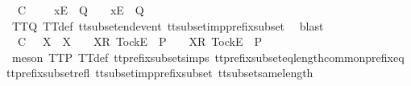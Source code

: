 \begin{isabellebody}
\ {\isachardoublequoteopen}{\isasymrho}{\isacharprime}\ {\isasymsubseteq}\isactrlsub C\ {\isasymrho}{\isacharprime}{\isacharprime}\ {\isasymLongrightarrow}\ {\isasymrho}{\isacharprime}{\isacharprime}\ {\isacharat}\ {\isacharbrackleft}{\isacharbrackleft}x{\isacharbrackright}\isactrlsub E{\isacharbrackright}\ {\isasymin}\ Q\ {\isasymLongrightarrow}\ {\isasymrho}{\isacharprime}\ {\isacharat}\ {\isacharbrackleft}{\isacharbrackleft}x{\isacharbrackright}\isactrlsub E{\isacharbrackright}\ {\isasymin}\ Q{\isachardoublequoteclose}\isanewline
\ \ \ \ \ \ \isamarkupfalse%
\ TT{}{\isacharunderscore}Q\ TT{}{\isacharunderscore}def\ tt{\isacharunderscore}subset{\isacharunderscore}end{\isacharunderscore}event\ tt{\isacharunderscore}subset{\isacharunderscore}imp{\isacharunderscore}prefix{\isacharunderscore}subset\ \isamarkupfalse%
\ blast\isanewline
\ \ \isamarkupfalse%
\isanewline
\ \ \ \ \isamarkupfalse%
\ {\isachardoublequoteopen}{\isasymrho}{\isacharprime}\ {\isasymsubseteq}\isactrlsub C\ {\isasymrho}{\isacharprime}{\isacharprime}\ {\isasymLongrightarrow}\ X\ {\isasymsubseteq}\ X{\isacharprime}\ {\isasymLongrightarrow}\ {\isasymrho}{\isacharprime}{\isacharprime}\ {\isacharat}\ {\isacharbrackleft}{\isacharbrackleft}X{\isacharprime}{\isacharbrackright}\isactrlsub R{\isacharcomma}\ {\isacharbrackleft}Tock{\isacharbrackright}\isactrlsub E{\isacharbrackright}\ {\isasymin}\ P\ {\isasymLongrightarrow}\ {\isasymrho}{\isacharprime}\ {\isacharat}\ {\isacharbrackleft}{\isacharbrackleft}X{\isacharbrackright}\isactrlsub R{\isacharcomma}\ {\isacharbrackleft}Tock{\isacharbrackright}\isactrlsub E{\isacharbrackright}\ {\isasymin}\ P{\isachardoublequoteclose}\isanewline
\ \ \ \ \ \ \isamarkupfalse%
\ {\isacharparenleft}meson\ TT{}{\isacharunderscore}P\ TT{}{\isacharunderscore}def\ tt{\isacharunderscore}prefix{\isacharunderscore}subset{\isachardot}simps{\isacharparenleft}{}{\isacharparenright}\ tt{\isacharunderscore}prefix{\isacharunderscore}subset{\isacharunderscore}eq{\isacharunderscore}length{\isacharunderscore}common{\isacharunderscore}prefix{\isacharunderscore}eq\ tt{\isacharunderscore}prefix{\isacharunderscore}subset{\isacharunderscore}refl\ tt{\isacharunderscore}subset{\isacharunderscore}imp{\isacharunderscore}prefix{\isacharunderscore}subset\ tt{\isacharunderscore}subset{\isacharunderscore}same{\isacharunderscore}length{\isacharparenright}\isanewline
\ \ \isamarkupfalse%
\isanewline
\ \ \ \ \isamarkupfalse%

\end{isabellebody}
